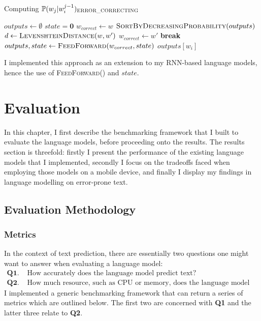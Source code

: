 \documentclass[a4paper, 12pt]{report}
\newcommand{\tbf}[1]{\textbf{#1}}
\begin{document}
\begin{algorithm}
\caption{Computing $\mathbb{P}(w_j | w_i^{j - 1})_{\text{\scshape ERROR\_CORRECTING}}$}
\label{alg:error_correction}
\begin{algorithmic}[1]
\State $outputs \gets \emptyset$
\State $state = \mathbf{0}$
	\State $w_{correct} \gets w$
	\If {$w \notin dictionary\ \tbf{and}\ outputs \neq \emptyset$}
		\State $\text{\scshape SortByDecreasingProbability}(outputs)$
			\State $d \gets \text{\scshape LevenshteinDistance}(w, w')$
				\State $w_{correct} \gets w'$
				\State \textbf{break}
			\EndIf
		\EndFor
	\EndIf
	\State $outputs, state \gets \text{\scshape FeedForward}(w_{correct}, state)$
\EndFor
\State \Return $outputs[w_i]$
\EndProcedure
\end{algorithmic}
\end{algorithm}

I implemented this approach as an extension to my RNN-based language models, hence the use of {\scshape FeedForward}() and $state$.

\chapter{Evaluation} \label{evaluation}

In this chapter, I first describe the benchmarking framework that I built to evaluate the language models, before proceeding onto the results. The results section is threefold: firstly I present the performance of the existing language models that I implemented, secondly I focus on the tradeoffs faced when employing those models on a mobile device, and finally I display my findings in language modelling on error-prone text.

\section{Evaluation Methodology}

\subsection{Metrics} \label{metrics}

In the context of text prediction, there are essentially two questions one might want to answer when evaluating a language model:
\begin{align*}
	\tbf{Q1. } & \text{How accurately does the language model predict text?} \\
	\tbf{Q2. } & \text{How much resource, such as CPU or memory, does the language model consume?}
\end{align*}
I implemented a generic benchmarking framework that can return a series of metrics which are outlined below. The first two are concerned with \tbf{Q1} and the latter three relate to \tbf{Q2}.
\end{document}

